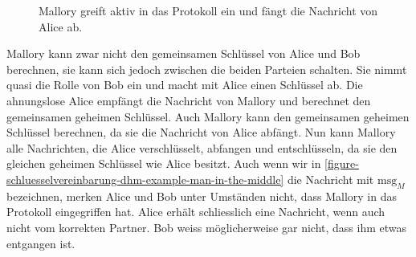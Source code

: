 \begin{figure}[htb]
\caption{Mallory greift aktiv in das Protokoll ein und fängt die Nachricht von Alice ab.}
\label{figure-schluesselvereinbarung-dhm-example-man-in-the-middle}
\end{figure}

Mallory kann zwar nicht den gemeinsamen Schlüssel von Alice und Bob berechnen, sie kann sich jedoch zwischen die beiden Parteien schalten. Sie nimmt quasi die Rolle von Bob ein und macht mit Alice einen Schlüssel ab. Die ahnungslose Alice empfängt die Nachricht von Mallory und berechnet den gemeinsamen geheimen Schlüssel. Auch Mallory kann den gemeinsamen geheimen Schlüssel berechnen, da sie die Nachricht von Alice abfängt. Nun kann Mallory alle Nachrichten, die Alice verschlüsselt, abfangen und entschlüsseln, da sie den gleichen geheimen Schlüssel wie Alice besitzt. Auch wenn wir in \autoref{figure-schluesselvereinbarung-dhm-example-man-in-the-middle} die Nachricht mit $\text{msg}_M$ bezeichnen, merken Alice und Bob unter Umständen nicht, dass Mallory in das Protokoll eingegriffen hat. Alice erhält schliesslich eine Nachricht, wenn auch nicht vom korrekten Partner. Bob weiss möglicherweise gar nicht, dass ihm etwas entgangen ist.


